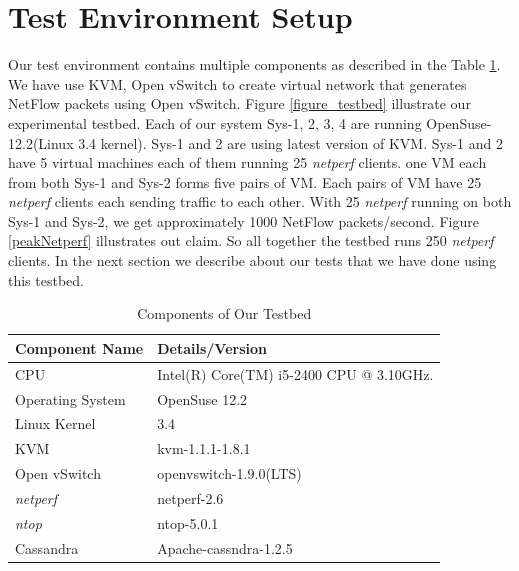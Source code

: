 \section{Test Environment Setup} \label{testbed}
	Our test environment contains multiple components as described in the Table \ref{table_testbed}. We have use KVM, Open vSwitch to create virtual network that generates NetFlow packets using Open vSwitch. Figure \ref{figure_testbed} illustrate our experimental testbed. Each of our system Sys-1, 2, 3, 4 are running OpenSuse-12.2(Linux 3.4 kernel). Sys-1 and 2 are using latest version of KVM. Sys-1 and 2 have 5 virtual machines each of them running 25 \emph{netperf} clients.%
	one VM each from both Sys-1 and Sys-2 forms five pairs of VM. Each pairs of VM have 25 \emph{netperf} clients each sending traffic to each other. With 25 \emph{netperf} running on both Sys-1 and Sys-2, we get approximately 1000 NetFlow packets/second. Figure \ref{peakNetperf} illustrates out claim. So all together the testbed runs 250 \emph{netperf} clients. In the next section we describe about our tests that we have done using this testbed.
	\begin{table}
	\centering
	 \begin{tabular}{|l|l|}
	  \hline
	  \textbf{Component Name} & \textbf{Details/Version} \\ \hline
	  CPU   & Intel(R) Core(TM) i5-2400 CPU @ 3.10GHz. \\ \hline
	  Operating System & OpenSuse 12.2 \\ \hline
	  Linux Kernel & 3.4 \\ \hline
	  KVM          & kvm-1.1.1-1.8.1 \\ \hline
	  Open vSwitch & openvswitch-1.9.0(LTS) \\ \hline
	  \emph{netperf} & netperf-2.6 \\ \hline
	  \emph{ntop}    & ntop-5.0.1 \\ \hline
	  Cassandra      & Apache-cassndra-1.2.5 \\ \hline	  
	 \end{tabular}
	  \label{table_testbed}
	  \caption{Components of Our Testbed}
	\end{table}

